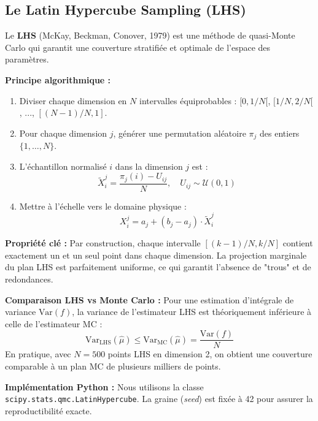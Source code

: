 \documentclass[journal, a4paper, twocolumn]{IEEEtran}
\begin{document}
\subsection{Le Latin Hypercube Sampling (LHS)}

Le \textbf{LHS} (McKay, Beckman, Conover, 1979) est une méthode de quasi-Monte Carlo qui garantit une couverture stratifiée et optimale de l'espace des paramètres.

\textbf{Principe algorithmique :}
\begin{enumerate}
    \item Diviser chaque dimension en $N$ intervalles équiprobables : $[0, 1/N[$, $[1/N, 2/N[$, ..., $[(N-1)/N, 1]$.
    \item Pour chaque dimension $j$, générer une permutation aléatoire $\pi_j$ des entiers $\{1, \ldots, N\}$.
    \item L'échantillon normalisé $i$ dans la dimension $j$ est :
    \begin{equation}
        \tilde{X}_i^j = \frac{\pi_j(i) - U_{ij}}{N}, \quad U_{ij} \sim \mathcal{U}(0,1)
        \label{eq:lhs_norm}
    \end{equation}
    \item Mettre à l'échelle vers le domaine physique :
    \begin{equation}
        X_i^j = a_j + (b_j - a_j) \cdot \tilde{X}_i^j
        \label{eq:lhs_scale}
    \end{equation}
\end{enumerate}

\textbf{Propriété clé :} Par construction, chaque intervalle $[(k-1)/N, k/N]$ contient exactement un et un seul point dans chaque dimension. La projection marginale du plan LHS est parfaitement uniforme, ce qui garantit l'absence de "trous" et de redondances.

\textbf{Comparaison LHS vs Monte Carlo :} Pour une estimation d'intégrale de variance $\text{Var}(f)$, la variance de l'estimateur LHS est théoriquement inférieure à celle de l'estimateur MC :
\begin{equation}
    \text{Var}_{\text{LHS}}(\hat{\mu}) \leq \text{Var}_{\text{MC}}(\hat{\mu}) = \frac{\text{Var}(f)}{N}
\end{equation}
En pratique, avec $N=500$ points LHS en dimension 2, on obtient une couverture comparable à un plan MC de plusieurs milliers de points.

\textbf{Implémentation Python :} Nous utilisons la classe \texttt{scipy.stats.qmc.LatinHypercube}. La graine (\textit{seed}) est fixée à 42 pour assurer la reproductibilité exacte.
\end{document}
